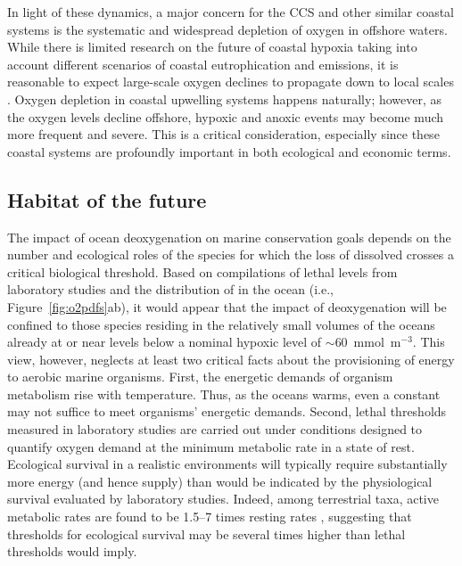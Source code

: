\documentclass[draft,linenumbers]{report_chapter}
\begin{document}
In light of these dynamics, a major concern for the CCS and other similar coastal systems is the systematic and widespread depletion of oxygen in offshore waters.
While there is limited research on the future of coastal hypoxia taking into account different scenarios of coastal eutrophication and emissions, it is reasonable to expect large-scale oxygen declines to propagate down to local scales \citep{Bianucci-Fennel-etal-2015}.
Oxygen depletion in coastal upwelling systems happens naturally; however, as the oxygen levels decline offshore, hypoxic and anoxic events may become much more frequent and severe.
This is a critical consideration, especially since these coastal systems are profoundly important in both ecological and economic terms.


\subsection{Habitat of the future}\label{loc:MI}

The impact of ocean deoxygenation on marine conservation goals depends on the number and ecological roles of the species for which the loss of dissolved  crosses a critical biological threshold.
Based on compilations of lethal  levels from laboratory studies and the distribution of  in the ocean (i.e., Figure~\ref{fig:o2pdfs}ab), it would appear that the impact of deoxygenation will be confined to those species residing in the relatively small volumes of the oceans already at or near  levels below a nominal hypoxic level of $\sim$60~mmol~m$^{-3}$.
This view, however, neglects at least two critical facts about the provisioning of energy to aerobic marine organisms.
First, the energetic demands of organism metabolism rise with temperature.   Thus, as the oceans warms, even a constant  may not suffice to meet organisms' energetic demands.
Second, lethal thresholds measured in laboratory studies are carried out under conditions designed to quantify oxygen demand at the minimum metabolic rate in a state of rest.
Ecological survival in a realistic environments will typically require substantially more energy (and hence  supply) than would be indicated by the physiological survival evaluated by laboratory studies.
Indeed, among terrestrial taxa, active metabolic rates are found to be 1.5--7 times resting rates \citep{Peterson-Nagy-etal-1990}, suggesting that  thresholds for ecological survival may be several times higher than lethal thresholds would imply.
\end{document}
